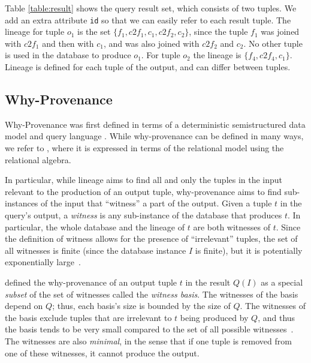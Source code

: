 Table \ref{table:result} shows the query result set, which consists of two tuples. We add an extra  attribute \texttt{id} so that we can easily refer to each result tuple.  
The lineage for tuple $o_1$ is the set $\{f_1, c2f_1, c_1, c2f_2, c_2\}$, since the tuple $f_1$ was joined with $c2f_1$ and then with $c_1$, and was also joined with $c2f_2$ and $c_2$. No other tuple is used in the database to produce $o_1$.
For tuple $o_2$ the lineage is $\{ f_4, c2f_4, c_1\}$.
Lineage is defined for each tuple of the output, and can differ between tuples.

\subsection{Why-Provenance}
Why-Provenance was first defined in terms of a deterministic semistructured data model and query language \citep{WhyProvBuneman}. 
While why-provenance can be defined in many ways, we refer to \citep{CheneyProvSurvey}, where it is expressed in terms of the relational model using the relational algebra.

In particular, while lineage aims to find all and only the tuples in the input relevant to the production of an output tuple, why-provenance aims to find sub-instances of the input that ``witness'' a part of the output. 
Given a tuple $t$ in the query's output, a \emph{witness} is any sub-instance of the database that produces $t$.
In particular, the whole database and the lineage of $t$ are both witnesses of $t$.
Since the definition of witness allows for the presence of ``irrelevant'' tuples, the set of all witnesses is finite (since the database instance $I$ is finite), but it is potentially exponentially large~\citep{CheneyProvSurvey}.

\citet{WhyProvBuneman} defined the why-provenance of an output tuple $t$ in the result $Q(I)$ as a special \emph{subset} of the set of witnesses called the \emph{witness basis}.
The witnesses of the basis depend on $ Q $; thus, each basis's size is bounded by the size of $ Q $. The witnesses of the basis exclude tuples that are irrelevant to $t$ being produced by $Q$, and thus the basis tends to be very small compared to the set of all possible witnesses~\citep{CheneyProvSurvey}.
The witnesses are also {\em minimal}, in the sense that if one tuple is removed from one of these witnesses, it cannot produce the output. %


